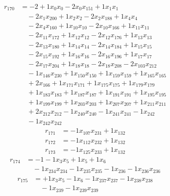 \[\begin{aligned}
r_{170} &= - 2 + 1 x_{0} x_{0} - 2 x_{0} x_{151} + 1 x_{1} x_{1} \\
 &\quad - 2 x_{1} x_{200} + 1 x_{2} x_{2} - 2 x_{2} x_{188} + 1 x_{4} x_{4} \\
 &\quad - 2 x_{4} x_{160} + 1 x_{10} x_{10} - 2 x_{10} x_{166} + 1 x_{11} x_{11} \\
 &\quad - 2 x_{11} x_{172} + 1 x_{12} x_{12} - 2 x_{12} x_{176} + 1 x_{13} x_{13} \\
 &\quad - 2 x_{13} x_{180} + 1 x_{14} x_{14} - 2 x_{14} x_{184} + 1 x_{15} x_{15} \\
 &\quad - 2 x_{15} x_{192} + 1 x_{16} x_{16} - 2 x_{16} x_{196} + 1 x_{17} x_{17} \\
 &\quad - 2 x_{17} x_{204} + 1 x_{18} x_{18} - 2 x_{18} x_{208} - 2 x_{103} x_{212} \\
 &\quad - 1 x_{146} x_{230} + 1 x_{150} x_{150} + 1 x_{159} x_{159} + 1 x_{165} x_{165} \\
 &\quad + 2 x_{166} + 1 x_{171} x_{171} + 1 x_{175} x_{175} + 1 x_{179} x_{179} \\
 &\quad + 1 x_{183} x_{183} + 1 x_{187} x_{187} + 1 x_{191} x_{191} + 1 x_{195} x_{195} \\
 &\quad + 1 x_{199} x_{199} + 1 x_{203} x_{203} + 1 x_{207} x_{207} + 1 x_{211} x_{211} \\
 &\quad + 2 x_{212} x_{212} - 1 x_{240} x_{240} - 1 x_{241} x_{241} - 1 x_{242} \\
 &\quad - 1 x_{242} x_{242}
\end{aligned}\]
\[\begin{aligned}
r_{171} &= - 1 x_{107} x_{231} + 1 x_{132}
\end{aligned}\]
\[\begin{aligned}
r_{172} &= - 1 x_{112} x_{232} + 1 x_{132}
\end{aligned}\]
\[\begin{aligned}
r_{173} &= - 1 x_{125} x_{233} + 1 x_{132}
\end{aligned}\]
\[\begin{aligned}
r_{174} &= - 1 - 1 x_{3} x_{5} + 1 x_{5} + 1 x_{6} \\
 &\quad - 1 x_{234} x_{234} - 1 x_{235} x_{235} - 1 x_{236} - 1 x_{236} x_{236}
\end{aligned}\]
\[\begin{aligned}
r_{175} &= + 1 x_{3} x_{5} - 1 x_{6} - 1 x_{237} x_{237} - 1 x_{238} x_{238} \\
 &\quad - 1 x_{239} - 1 x_{239} x_{239}
\end{aligned}\]
